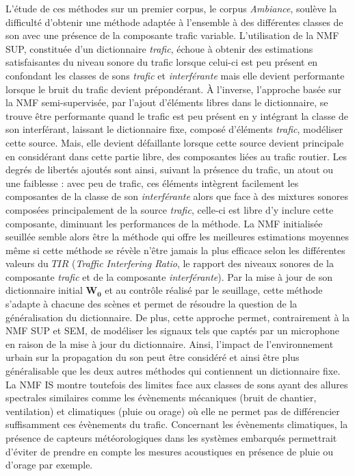 L'étude de ces méthodes sur un premier corpus, le corpus \textit{Ambiance},  soulève la difficulté d'obtenir une méthode adaptée à l'ensemble à des différentes classes de son avec une présence de la composante trafic variable.
L'utilisation de la NMF SUP, constituée d'un dictionnaire \textit{trafic}, échoue à obtenir des estimations satisfaisantes du niveau sonore du trafic lorsque celui-ci est peu présent en confondant les classes de sons \textit{trafic} et \textit{interférante} mais elle devient performante lorsque le bruit du trafic devient prépondérant.
À l'inverse, l'approche basée sur la NMF semi-supervisée, par l'ajout d'éléments libres dans le dictionnaire, se trouve être performante quand le trafic est peu présent en y intégrant la classe de son interférant, laissant le dictionnaire fixe, composé d'éléments \textit{trafic}, modéliser cette source.
Mais, elle devient défaillante lorsque cette source devient principale en considérant dans cette partie libre, des composantes liées au trafic routier. Les degrés de libertés ajoutés sont ainsi, suivant la présence du trafic, un atout ou une faiblesse : avec peu de trafic, ces éléments intègrent facilement les composantes de la classe de son \textit{interférante} alors que face à des mixtures sonores composées principalement de la source \textit{trafic}, celle-ci est libre d'y inclure cette composante, diminuant les performances de la méthode.
La NMF initialisée seuillée semble alors être la méthode qui offre les meilleures estimations moyennes même si cette méthode se révèle n'être jamais la plus efficace selon les différentes valeurs du $TIR$ (\textit{Traffic Interfering Ratio}, le rapport des niveaux sonores de la composante \textit{trafic} et de la composante \textit{interférante}). Par la mise à jour de son dictionnaire initial $\mathbf{W_0}$ et au contrôle réalisé par le seuillage, cette méthode s'adapte à chacune des scènes et permet de résoudre la question de la généralisation du dictionnaire. De plus, cette approche permet, contrairement à la NMF SUP et SEM, de modéliser les signaux tels que captés par un microphone en raison de la mise à jour du dictionnaire. Ainsi, l'impact de l'environnement urbain sur la propagation du son peut être considéré et ainsi être plus généralisable que les deux autres méthodes qui contiennent un dictionnaire fixe. La NMF IS montre toutefois des limites face aux classes de sons ayant des allures spectrales similaires comme les évènements mécaniques (bruit de chantier, ventilation) et climatiques (pluie ou orage) où elle ne permet pas de différencier suffisamment ces évènements du trafic. Concernant les évènements climatiques, la présence de capteurs météorologiques dans les systèmes embarqués permettrait d'éviter de prendre en compte les mesures acoustiques en présence de pluie ou d'orage par exemple.

